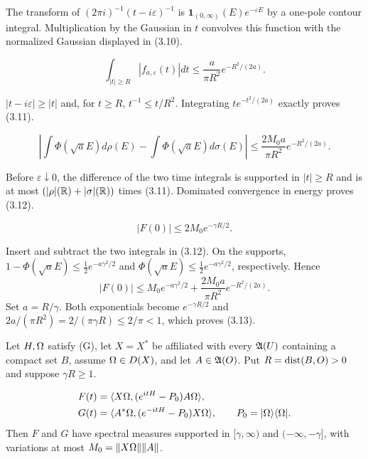 \documentclass[11pt,a4paper]{article}
\begin{document}
\Because The transform of $(2\pi i)^{-1}(t-i\varepsilon)^{-1}$ is
$\mathbf1_{(0,\infty)}(E)e^{-\varepsilon E}$ by a one-pole contour integral.
Multiplication by the Gaussian in $t$ convolves this function with the normalized
Gaussian displayed in (3.10).

\[
 \int_{|t|\geq R}|f_{a,\varepsilon}(t)|dt
 \leq\frac a{\pi R^2}e^{-R^2/(2a)}.                               \tag{3.11}
\]

\Because $|t-i\varepsilon|\geq|t|$ and, for $t\geq R$,
$t^{-1}\leq t/R^2$.  Integrating $te^{-t^2/(2a)}$ exactly proves (3.11).

\[
 \left|\int\Phi(\sqrt aE)d\rho(E)-
       \int\Phi(\sqrt aE)d\sigma(E)\right|
 \leq\frac{2M_0a}{\pi R^2}e^{-R^2/(2a)}.                          \tag{3.12}
\]

\Because Before $\varepsilon\downarrow0$, the difference of the two time integrals
is supported in $|t|\geq R$ and is at most
$(|\rho|(\mathbb R)+|\sigma|(\mathbb R))$ times (3.11).  Dominated convergence in energy proves
(3.12).

\[
 |F(0)|\leq2M_0e^{-\gamma R/2}.                                   \tag{3.13}
\]

\Because Insert and subtract the two integrals in (3.12).  On the supports,
$1-\Phi(\sqrt aE)\leq\tfrac12e^{-a\gamma^2/2}$ and
$\Phi(\sqrt aE)\leq\tfrac12e^{-a\gamma^2/2}$, respectively.  Hence
\[
 |F(0)|\leq M_0e^{-a\gamma^2/2}
 +\frac{2M_0a}{\pi R^2}e^{-R^2/(2a)}.
\]
Set $a=R/\gamma$.  Both exponentials become $e^{-\gamma R/2}$ and
$2a/(\pi R^2)=2/(\pi\gamma R)\leq2/\pi<1$, which proves (3.13).

\QedStep


Let $H,\Omega$ satisfy (G), let $X=X^*$ be affiliated with every $\mathfrak A(U)$ containing
a compact set $B$, assume $\Omega\in D(X)$, and let $A\in\mathfrak A(O)$.  Put
$R=\operatorname{dist}(B,O)>0$ and suppose $\gamma R\geq1$.

\begin{align*}
 F(t)&=\langle X\Omega,(e^{itH}-P_0)A\Omega\rangle,\\
 G(t)&=\langle A^*\Omega,(e^{-itH}-P_0)X\Omega\rangle,
 \qquad P_0=|\Omega\rangle\langle\Omega|.
\end{align*}
Then $F$ and $G$ have spectral measures supported in
$[\gamma,\infty)$ and $(-\infty,-\gamma]$, with variations at most
$M_0=\|X\Omega\|\|A\|$.
\end{document}
